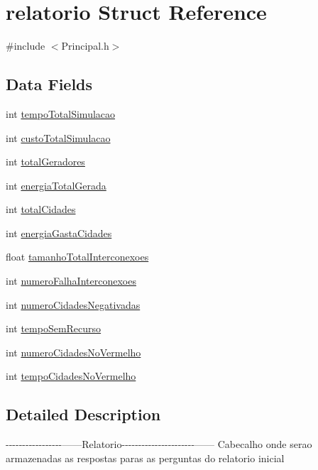\hypertarget{structrelatorio}{\section{relatorio Struct Reference}
\label{structrelatorio}
}


{\ttfamily \#include $<$Principal.\-h$>$}

\subsection*{Data Fields}
\begin{DoxyCompactItemize}
\item 
int \hyperlink{structrelatorio_a896c216e7b40d0a66f0defe39780bbc7}{tempo\-Total\-Simulacao}
\item 
int \hyperlink{structrelatorio_a60dbda1bf87163f0e3bb48a5092ce83c}{custo\-Total\-Simulacao}
\item 
int \hyperlink{structrelatorio_ae0aaf407daf7bcb7b0926e07d8752de8}{total\-Geradores}
\item 
int \hyperlink{structrelatorio_a3ebe59d03c30f5f8745c4a51681faf5f}{energia\-Total\-Gerada}
\item 
int \hyperlink{structrelatorio_a3648fada6905f25d99068e9a20cd5530}{total\-Cidades}
\item 
int \hyperlink{structrelatorio_a5f094032863ab91e30b6402ec2dee20b}{energia\-Gasta\-Cidades}
\item 
float \hyperlink{structrelatorio_a48b9ddc11a85e97aa01781f77aefeedb}{tamanho\-Total\-Interconexoes}
\item 
int \hyperlink{structrelatorio_a0c6b04386053607cfdb9e2b1802b757b}{numero\-Falha\-Interconexoes}
\item 
int \hyperlink{structrelatorio_a1f4ad19add703d225ad9cc065986599b}{numero\-Cidades\-Negativadas}
\item 
int \hyperlink{structrelatorio_acb8cb62eff0dbcfbcf0b2a676198cc85}{tempo\-Sem\-Recurso}
\item 
int \hyperlink{structrelatorio_a0327117f426cb7f07c0c40c385ecd2c6}{numero\-Cidades\-No\-Vermelho}
\item 
int \hyperlink{structrelatorio_af7a263e74b16ce4e9b5b49fe3ebe802d}{tempo\-Cidades\-No\-Vermelho}
\end{DoxyCompactItemize}


\subsection{Detailed Description}
-\/-\/-\/-\/-\/-\/-\/-\/-\/-\/-\/-\/-\/-\/-\/-\/-\/------Relatorio-\/-\/-\/-\/-\/-\/-\/-\/-\/-\/-\/-\/-\/-\/-\/-\/-\/-\/-\/-\/-\/-\/------ Cabecalho onde serao armazenadas as respostas paras as perguntas do relatorio inicial

